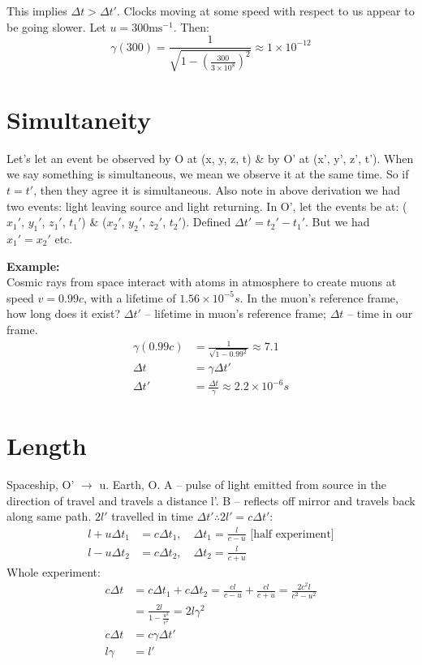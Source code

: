 \documentclass[a4paper, 11pt, normalem]{report}
\begin{document}
This implies $\Delta t > \Delta t'$.
Clocks moving at some speed with respect to us appear to be going slower.
Let $u = 300\text{ms}^{-1}$.
Then:
\begin{equation}
    \gamma(300) = \frac{1}{\sqrt{1 - (\tfrac{300}{3\times10^{8}})^{2}}} \approx 1\times10^{-12}
\end{equation}

\section{Simultaneity}
Let's let an event be observed by O at (x, y, z, t) \& by O' at (x', y', z', t').
When we say something is simultaneous, we mean we observe it at the same time.
So if $t = t'$, then they agree it is simultaneous.
Also note in above derivation we had two events: light leaving source and light returning.
In O', let the events be at:
($x_{1}'$, $y_{1}'$, $z_{1}'$, $t_{1}'$) \& ($x_{2}'$, $y_{2}'$, $z_{2}'$, $t_{2}'$).
Defined $\Delta t' = t_{2}' - t_{1}'$.
But we had $x_{1}' = x_{2}'$ etc.

\textbf{Example:}\\
Cosmic rays from space interact with atoms in atmosphere to create muons at speed $v = 0.99c$, with a lifetime of $1.56\times10^{-5}s$.
In the muon's reference frame, how long does it exist?
$\Delta t'$ -- lifetime in muon's reference frame;
$\Delta t$ -- time in our frame.
\begin{align}
    \gamma(0.99c) &= \frac{1}{\sqrt{1 - 0.99^{2}}} \approx 7.1 \\
    \Delta t &= \gamma\Delta t' \\
    \Delta t' &= \frac{\Delta t}{\gamma} \approx 2.2\times10^{-6}s
\end{align}

\section{Length}
Spaceship, O' $\rightarrow$ u.
Earth, O.
A -- pulse of light emitted from source in the direction of travel and travels a distance l'.
B -- reflects off mirror and travels back along same path.
$2l'$ travelled in time $\Delta t' \therefore 2l' = c\Delta t'$:
\begin{align}
    l + u\Delta t_{1} &= c\Delta t_{1},\quad \Delta t_{1} = \frac{l}{c - u} \text{ [half experiment]} \\
    l - u\Delta t_{2} &= c\Delta t_{2},\quad \Delta t_{2} = \frac{l}{c + u}
\end{align}
Whole experiment:
\begin{align}
    c\Delta t &= c\Delta t_{1} + c\Delta t_{2} = \frac{cl}{c - u} + \frac{cl}{c + u} = \frac{2c^{2}l}{c^{2} - u^{2}} \\
              &= \frac{2l}{1 - \tfrac{u^{2}}{c^{2}}} = 2l\gamma^{2} \\
    c\Delta t &= c\gamma\Delta t' \\
    l\gamma &= l'
\end{align}
\end{document}
